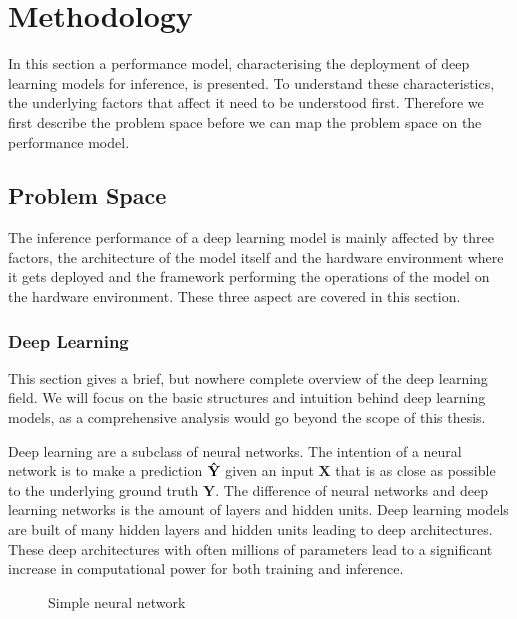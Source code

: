 \chapter{Methodology}
\label{chap:methodology}
In this section a performance model, characterising the deployment of deep learning models for inference, is presented. To understand these characteristics, the underlying factors that affect it need to be understood first. Therefore we first describe the problem space before we can map the problem space on the performance model.


\section{Problem Space}
The inference performance of a deep learning model is mainly affected by three factors, the architecture of the model itself and the hardware environment where it gets deployed and the framework performing the operations of the model on the hardware environment.
These three aspect are covered in this section.


\subsection{Deep Learning}
This section gives a brief, but nowhere complete overview of the deep learning field. We will focus on the basic structures and intuition behind deep learning models, as a comprehensive analysis would go beyond the scope of this thesis.

Deep learning are a subclass of neural networks.
The intention of a neural network is to make a prediction $\mathbf{\Hat{Y}}$ given an input $\mathbf{X}$ that is as close as possible to the underlying ground truth $\mathbf{Y}$. 
The difference of neural networks and deep learning networks is the amount of layers and hidden units. Deep learning models are built of many hidden layers and hidden units leading to deep architectures.
These deep architectures with often millions of parameters lead to a significant increase in computational power for both training and inference.
\begin{figure}[!htb]
    \centering
    \resizebox{.8\linewidth}{!}{}
    \caption{Simple neural network}
    \label{fig:simpleNN}
\end{figure}

